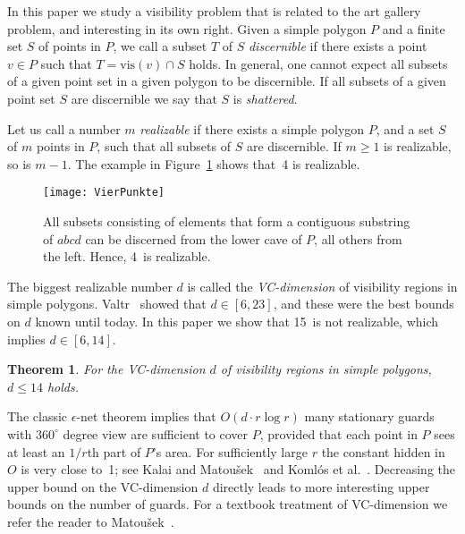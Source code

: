 \documentclass[11pt]{article}
\newtheorem{theorem}{Theorem}
\begin{document}
In this paper we study a visibility problem that is related to the art gallery problem, and interesting
in its own right. Given a simple polygon $P$ and a finite set $S$ of points in $P$, we call a subset $T$
of $S$ {\em  discernible} if there exists a point $v \in P$ such that $T=\mbox{vis}(v) \cap S$ holds.
In general, one cannot expect all subsets of a given point set in a given polygon to be discernible.
If all subsets of a given point set $S$ are discernible we say that $S$ is \textit{shattered}.

Let us call a number $m$ {\em realizable} if there exists a simple polygon $P$, and a set $S$ of $m$
points in $P$, such that all subsets of $S$ are discernible. If $m \geq 1$ is realizable, so is $m-1$.
The example in Figure~\ref{VierPunkte-fig} shows that~4 is realizable. 

\begin{figure}[hbtp]\begin{center}\texttt{[image: VierPunkte]}\caption{All subsets consisting of elements that form a contiguous substring of $abcd$ can be discerned from the 
    lower cave of $P$, all others from the left. Hence, 4~is realizable.}\label{VierPunkte-fig}
  \end{center}\end{figure}

The biggest realizable number $d$ is called
the {\em VC-dimension} of visibility regions in simple polygons. 
Valtr~\cite{v-ggwps-98} showed that $d \in [6,23]$, and these were the best bounds on $d$
known until today. 
In this paper we show that 15~is not realizable, which implies $d \in [6,14]$.

\begin{theorem}   \label{statement-theo}
For the VC-dimension $d$ of visibility  regions in simple polygons, $d \leq 14$ holds.
\end{theorem}

The classic $\epsilon$-net theorem implies that $O(d\cdot r \log r)$ many stationary guards
with $360^\circ$ degree view are sufficient to cover $P$, provided that each point in $P$ sees
at least an $1/r$th part of $P$'s area. For sufficiently large $r$ the constant hidden in $O$ is very close to~1; 
see Kalai and Matou\v sek~\cite{km-ggwep-97} and Koml{\'o}s et al.~\cite{kpw-atben-92}. Decreasing the upper bound on the VC-dimension $d$ directly leads to more interesting 
upper bounds on the number of guards. 
For a textbook treatment of VC-dimension we refer the reader to Matou\v sek~\cite{m-ldg-02}.
\end{document}
